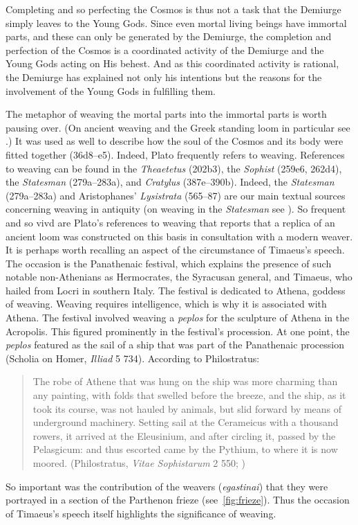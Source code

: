 Completing and so perfecting the Cosmos is thus not a task that the Demiurge simply leaves to the Young Gods. Since even mortal living beings have immortal parts, and these can only be generated by the Demiurge, the completion and perfection of the Cosmos is a coordinated activity of the Demiurge and the Young Gods acting on His behest. And as this coordinated activity is rational, the Demiurge has explained not only his intentions but the reasons for the involvement of the Young Gods in fulfilling them.

The metaphor of weaving the mortal parts into the immortal parts is worth pausing over. (On ancient weaving and the Greek standing loom in particular see \citealt{Burke:2010aa,Crowfoot:1936aa,Flores:2006aa,Hoffmann:1964aa}.) It was used as well to describe how the soul of the Cosmos and its body were fitted together (36d8–e5). Indeed, Plato frequently refers to weaving. References to weaving can be found in the \emph{Theaetetus} (202b3), the \emph{Sophist} (259e6, 262d4), the \emph{Statesman} (279a--283a), and \emph{Cratylus} (387e--390b). Indeed, the \emph{Statesman} (279a--283a) and Aristophanes' \emph{Lysistrata} (565--87) are our main textual sources concerning weaving in antiquity (on weaving in the \emph{Statesman} see \citealt{Cole:1991qq}). So frequent and so vivd are Plato's references to weaving that \citet[44, n1]{Skemp:1952aa} reports that a replica of an ancient loom was constructed on this basis in consultation with a modern weaver. It is perhaps worth recalling an aspect of the circumstance of Timaeus's speech. The occasion is the Panathenaic festival, which explains the presence of such notable non-Athenians as Hermocrates, the Syracusan general, and Timaeus, who hailed from Locri in southern Italy. The festival is dedicated to Athena, goddess of weaving. Weaving requires intelligence, which is why it is associated with Athena. The festival involved weaving a \emph{peplos} for the sculpture of Athena in the Acropolis. This figured prominently in the festival's procession. At one point, the \emph{peplos} featured as the sail of a ship that was part of the Panathenaic procession (Scholia on Homer, \emph{Illiad} 5 734). According to Philostratus: 
\begin{quote}
	The robe of Athene that was hung on the ship was more charming than any painting, with folds that swelled before the breeze, and the ship, as it took its course, was not hauled by animals, but slid forward by means of underground machinery. Setting sail at the Cerameicus with a thousand rowers, it arrived at the Eleusinium, and after circling it, passed by the Pelasgicum: and thus escorted came by the Pythium, to where it is now moored. (Philostratus, \emph{Vitae Sophistarum} 2 550; \citealt[147]{Wright:1922aa})
\end{quote}
So important was the contribution of the weavers (\emph{egastinai}) that they were portrayed in a section of the Parthenon frieze (see~\ref{fig:frieze}). Thus the occasion of Timaeus's speech itself highlights the significance of weaving. 

